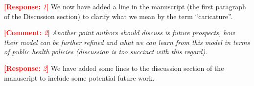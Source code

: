 \documentclass[12pt]{article}
\newcommand{\comment}{\showcomment}
\newcommand{\showcomment}[3]{\textcolor{#1}{\textbf{[#2: }\textsl{#3}\textbf{]}}}
\DeclareRobustCommand\_{\ifmmode\expandafter\subtxt\else\textunderscore\fi}
\newcommand{\com}[1]{\comment{red}{Comment}{#1}} %
\newcommand{\res}[1]{\comment{red}{Response}{#1}} %
\begin{document}
\res 1
We now have added a line in the manuscript (the first paragraph of the Discussion section) to clarify what we mean by the term ``caricature''. 

\com 2 
{\it Another point authors should discuss is future prospects, how their model can be further refined and what we can learn from this model in terms of public health policies (discussion is too succinct with this regard).}

\res 2
We have added some lines to the discussion section of the manuscript to include some potential future work.
\end{document}
